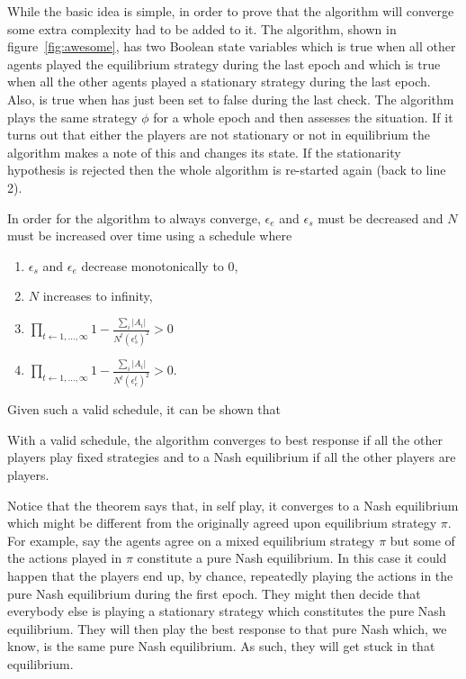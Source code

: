 While the basic idea is simple, in order to prove that the algorithm
will converge some extra complexity had to be added to it. The
algorithm, shown in figure~\ref{fig:awesome}, has two Boolean state
variables  which is true when all other agents
played the equilibrium strategy during the last epoch and
 which is true when all the other agents played
a stationary strategy during the last epoch. Also,
 is true when
 has just been set to false during the last
check. The algorithm plays the same strategy $\phi$ for a whole epoch
and then assesses the situation. If it turns out that either the
players are not stationary or not in equilibrium the algorithm makes a
note of this and changes its state. If the stationarity hypothesis is
rejected then the whole algorithm is re-started again (back to line
2).

In order for the algorithm to always converge, $\epsilon_e$ and
$\epsilon_s$ must be decreased and $N$ must be increased over time
using a schedule where
\begin{enumerate}
\item $\epsilon_s$ and $\epsilon_e$ decrease monotonically to 0,
\item $N$ increases to infinity,
\item $\prod_{t \leftarrow 1,\ldots,\infty} 1 - \frac{\sum_i
    |A_i|}{N^t(\epsilon_s^t)^2} > 0$
\item $\prod_{t \leftarrow 1,\ldots,\infty} 1 - \frac{\sum_i
    |A_i|}{N^t(\epsilon_e^t)^2} > 0$.
\end{enumerate}

Given such a valid schedule, it can be shown that
\begin{theorem}
  With a valid schedule, the  algorithm converges to
  best response if all the other players play fixed strategies and to
  a Nash equilibrium if all the other players are 
  players.
\end{theorem}

Notice that the theorem says that, in self play, it converges to a
Nash equilibrium which might be different from the originally agreed
upon equilibrium strategy $\pi$. For example, say the agents agree on a
mixed equilibrium strategy $\pi$ but some of the actions played in
$\pi$ constitute a pure Nash equilibrium. In this case it could happen
that the players end up, by chance, repeatedly playing the actions in
the pure Nash equilibrium during the first epoch. They might then
decide that everybody else is playing a stationary strategy which
constitutes the pure Nash equilibrium. They will then play the best
response to that pure Nash which, we know, is the same pure Nash
equilibrium. As such, they will get stuck in that equilibrium.

